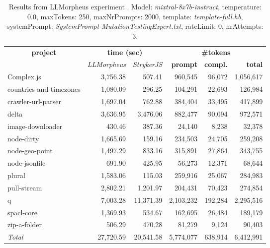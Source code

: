 
\begin{table*}[hbt!]
\centering
{\scriptsize
\begin{tabular}{l||r|r|r|r|r}
\multicolumn{1}{c|}{\bf project} & \multicolumn{2}{|c|}{\bf time (sec)} & \multicolumn{3}{|c|}{\bf \#tokens} \\
               & {\it LLMorpheus} & {\it StrykerJS} & {\bf prompt} & {\bf compl.} & {\bf total} \\
\hline
  Complex.js & 3,756.38 & 507.41 & 960,545 & 96,072 & 1,056,617 \\ 
countries-and-timezones & 1,080.09 & 296.25 & 104,291 & 22,693 & 126,984 \\ 
crawler-url-parser & 1,697.04 & 762.88 & 384,404 & 33,495 & 417,899 \\ 
delta & 3,636.95 & 3,476.06 & 882,477 & 90,094 & 972,571 \\ 
image-downloader & 430.46 & 387.36 & 24,140 & 8,238 & 32,378 \\ 
node-dirty & 1,665.69 & 159.16 & 234,503 & 24,705 & 259,208 \\ 
node-geo-point & 1,497.29 & 833.16 & 315,891 & 27,864 & 343,755 \\ 
node-jsonfile & 691.90 & 425.95 & 56,273 & 12,371 & 68,644 \\ 
plural & 1,583.06 & 115.03 & 259,916 & 25,067 & 284,983 \\ 
pull-stream & 2,802.21 & 1,201.97 & 204,431 & 70,423 & 274,854 \\ 
q & 7,003.28 & 11,371.39 & 2,103,232 & 192,284 & 2,295,516 \\ 
spacl-core & 1,369.93 & 534.67 & 162,695 & 26,484 & 189,179 \\ 
zip-a-folder & 506.29 & 470.28 & 81,279 & 9,124 & 90,403 \\ 
\hline
  \textit{Total} & 27,720.59 & 20,541.58 & 5,774,077 & 638,914 & 6,412,991 \\
  \end{tabular}
  }
  \\[2mm]
  \caption{Results from LLMorpheus experiment .
    Model: \textit{mixtral-8x7b-instruct}, 
    temperature: 0.0, 
    maxTokens: 250, 
    maxNrPrompts: 2000, 
    template: \textit{template-full.hb}, 
    systemPrompt: \textit{SystemPrompt-MutationTestingExpert.txt}, 
    rateLimit: 0, 
    nrAttempts: 3.  
  }
  \label{table:Cost:run360:mixtral-8x7b-instruct:template-full.hb:0.0}
\end{table*}